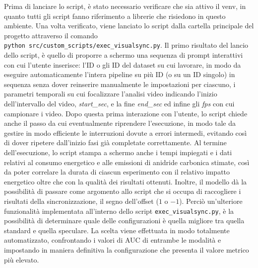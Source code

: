 Prima di lanciare lo script, è stato necessario verificare che sia attivo il venv, in quanto tutti gli script fanno riferimento a librerie che risiedono in questo ambiente. Una volta verificato, viene lanciato lo script dalla cartella principale del progetto attraverso il comando \texttt{python\ src/custom\_scripts/exec\_visualsync.py}. Il primo risultato del lancio dello script, è quello di proporre a schermo una sequenza di prompt interattivi con cui l'utente inserisce: l'ID o gli ID del dataset su cui lavorare, in modo da eseguire automaticamente l'intera pipeline su più ID (o su un ID singolo) in sequenza senza dover reinserire manualmente le impostazioni per ciascuno, i parametri temporali su cui focalizzare l'analisi video indicando l'inizio dell'intervallo del video, \textit{start\_sec}, e la fine \textit{end\_sec} ed infine gli \textit{fps} con cui campionare i video. Dopo questa prima interazione con l'utente, lo script chiede anche il passo da cui eventualmente riprendere l'esecuzione, in modo tale da gestire in modo efficiente le interruzioni dovute a errori intermedi, evitando così di dover ripetere dall'inizio fasi già completate correttamente. Al termine dell'esecuzione, lo script stampa a schermo anche i tempi impiegati e i dati relativi al consumo energetico e alle emissioni di anidride carbonica stimate, così da poter correlare la durata di ciascun esperimento con il relativo impatto energetico oltre che con la qualità dei risultati ottenuti.
Inoltre, il modello dà la possibilità di passare come argomento allo script che si occupa di raccogliere i risultati della sincronizzazione, il segno dell'offset ($1$ o $-1$).
Perciò un'ulteriore funzionalità implementata all'interno dello script \texttt{exec\_visualsync.py}, è la possibilità di determinare quale delle configurazioni è quella migliore tra quella standard e quella speculare. La scelta viene effettuata in modo totalmente automatizzato, confrontando i valori di AUC di entrambe le modalità e impostando in maniera definitiva la configurazione che presenta il valore metrico più elevato.

